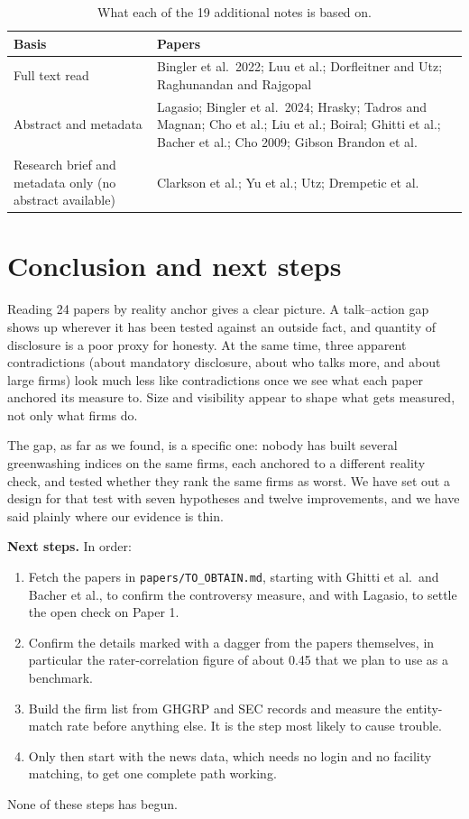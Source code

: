 \documentclass[12pt,a4paper]{article}
\begin{document}
\begin{table}[!htbp]
\centering
\caption{What each of the 19 additional notes is based on.}
\label{tab:basis}
\small
\begin{tabularx}{\textwidth}{@{}L{4.2cm}X@{}}
\toprule
\textbf{Basis} & \textbf{Papers}\\
\midrule
Full text read & Bingler et al.\ 2022; Luu et al.; Dorfleitner and Utz; Raghunandan and Rajgopal\\
Abstract and metadata & Lagasio; Bingler et al.\ 2024; Hrasky; Tadros and Magnan; Cho et al.; Liu et al.; Boiral; Ghitti et al.; Bacher et al.; Cho 2009; Gibson Brandon et al.\\
Research brief and metadata only (no abstract available) & Clarkson et al.; Yu et al.; Utz; Drempetic et al.\\
\bottomrule
\end{tabularx}
\end{table}

\section{Conclusion and next steps}
\label{sec:conclusion}

Reading 24 papers by reality anchor gives a clear picture. A talk--action gap shows up wherever it
has been tested against an outside fact, and quantity of disclosure is a poor proxy for honesty. At
the same time, three apparent contradictions (about mandatory disclosure, about who talks more, and
about large firms) look much less like contradictions once we see what each paper anchored its
measure to. Size and visibility appear to shape what gets measured, not only what firms do.

The gap, as far as we found, is a specific one: nobody has built several greenwashing indices on
the same firms, each anchored to a different reality check, and tested whether they rank the same
firms as worst. We have set out a design for that test with seven hypotheses and twelve
improvements, and we have said plainly where our evidence is thin.

\textbf{Next steps.} In order:
\begin{enumerate}
\item Fetch the papers in \texttt{papers/TO\_OBTAIN.md}, starting with Ghitti et al.\ and Bacher et
  al., to confirm the controversy measure, and with Lagasio, to settle the open check on Paper 1.
\item Confirm the details marked with a dagger from the papers themselves, in particular the
  rater-correlation figure of about 0.45 that we plan to use as a benchmark.
\item Build the firm list from GHGRP and SEC records and measure the entity-match rate before
  anything else. It is the step most likely to cause trouble.
\item Only then start with the news data, which needs no login and no facility matching, to get one
  complete path working.
\end{enumerate}
None of these steps has begun.



\end{document}
